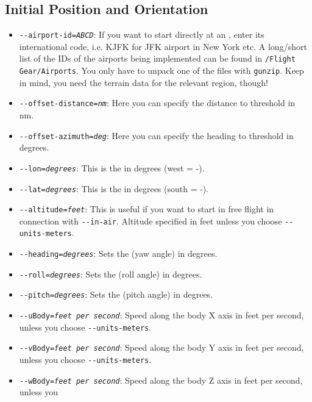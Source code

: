 \subsection{Initial Position and Orientation\label{aiportid}}
\begin{itemize}
\item{\texttt{-$ $-airport-id={\it ABCD}}}: If you want to start directly at an ,
  enter its international code, i.e. KJFK for JFK airport in New York etc.
  A long/short list of the IDs of the airports being implemented can
  be found in \texttt{/Flight Gear/Airports}. You only have to unpack
  one of the files with \texttt{gunzip}. Keep in mind, you need the
  terrain data for the relevant region, though!
\item{\texttt{-$ $-offset-distance={\it nm}}}: Here you can specify the distance to
threshold in nm.
\item{\texttt{-$ $-offset-azimuth={\it deg}}}: Here you can specify the heading to
threshold in degrees.
\item{\texttt{-$ $-lon={\it degrees}}}: This is the  in degrees (west =
-).
\item{\texttt{-$ $-lat={\it degrees}}}: This is the  in degrees (south =
-).
\item{\texttt{-$ $-altitude={\it feet}}}: This is useful if you want to start in free
flight in connection with \texttt{-$ $-in-air}. Altitude specified in feet unless you
choose \texttt{-$ $-units-meters}.
\item{\texttt{-$ $-heading={\it degrees}}}: Sets the  (yaw angle) in degrees.
\item{\texttt{-$ $-roll={\it degrees}}}: Sets the  (roll angle) in degrees.
\item{\texttt{-$ $-pitch={\it degrees}}}: Sets the  (pitch angle) in degrees.
\item{\texttt{-$ $-uBody={\it feet per second}}}: Speed along the body X axis in feet per second, unless you
choose \texttt{-$ $-units-meters}.
\item{\texttt{-$ $-vBody={\it feet per second}}}: Speed along the body Y axis in feet per second, unless you
choose \texttt{-$ $-units-meters}.
\item{\texttt{-$ $-wBody={\it feet per second}}}: Speed along the body Z axis in feet per second, unless you

\end{itemize}

